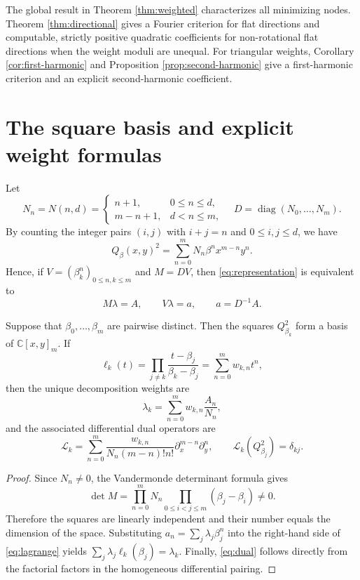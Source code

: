 \documentclass[10pt,twoside,final]{siamart1116}
\numberwithin{equation}{section}
\numberwithin{theorem}{section}
\newcommand{\C}{\mathbb C}
\newcommand{\diag}{\operatorname{diag}}
\begin{document}
The global result in Theorem \ref{thm:weighted} characterizes all minimizing nodes.
Theorem \ref{thm:directional} gives a Fourier criterion for flat directions and
computable, strictly positive quadratic coefficients for non-rotational flat
directions when the weight moduli are unequal. For triangular weights,
Corollary \ref{cor:first-harmonic} and Proposition \ref{prop:second-harmonic}
give a first-harmonic criterion and an explicit second-harmonic coefficient.


\section{The square basis and explicit weight formulas}\label{sec:basis}

Let
\begin{equation}\label{eq:N}
N_n=N(n,d)=\begin{cases}n+1,&0\le n\le d,\\m-n+1,&d<n\le m,\end{cases}
\quad D=\diag(N_0,\ldots,N_m).
\end{equation}
By counting the integer pairs $(i,j)$ with $i+j=n$ and $0\le i,j\le d$, we have
\begin{equation}\label{eq:square}
Q_\beta(x,y)^2=\sum_{n=0}^{m}N_n\beta^n x^{m-n}y^n.
\end{equation}
Hence, if $V=(\beta_k^n)_{0\le n,k\le m}$ and $M=DV$, then
\eqref{eq:representation} is equivalent to
\begin{equation}\label{eq:system}
M\lambda=A,\qquad V\lambda=a,\qquad a=D^{-1}A.
\end{equation}

\begin{theorem}\label{thm:basis}
Suppose that $\beta_0,\ldots,\beta_m$ are pairwise distinct. Then the squares
$Q_{\beta_k}^2$ form a basis of $\C[x,y]_m$. If
\[
\ell_k(t)=\prod_{j\ne k}\frac{t-\beta_j}{\beta_k-\beta_j}
=\sum_{n=0}^{m}w_{k,n}t^n,
\]
then the unique decomposition weights are
\begin{equation}\label{eq:lagrange}
\lambda_k=\sum_{n=0}^{m}w_{k,n}\frac{A_n}{N_n},
\end{equation}
and the associated differential dual operators are
\begin{equation}\label{eq:dual}
\mathcal L_k=\sum_{n=0}^{m}\frac{w_{k,n}}{N_n(m-n)!n!}
\partial_x^{m-n}\partial_y^n,
\qquad \mathcal L_k(Q_{\beta_j}^2)=\delta_{kj}.
\end{equation}
\end{theorem}
\begin{proof}
Since $N_n\ne0$, the Vandermonde determinant formula gives
\[
\det M=\prod_{n=0}^{m}N_n\prod_{0\le i<j\le m}(\beta_j-\beta_i)\ne0.
\]
Therefore the squares are linearly independent and their number equals the dimension of
the space. Substituting $a_n=\sum_j\lambda_j\beta_j^n$ into the right-hand side of
\eqref{eq:lagrange} yields $\sum_j\lambda_j\ell_k(\beta_j)=\lambda_k$. Finally,
\eqref{eq:dual} follows directly from the factorial factors in the homogeneous
differential pairing.
\end{proof}
\end{document}
